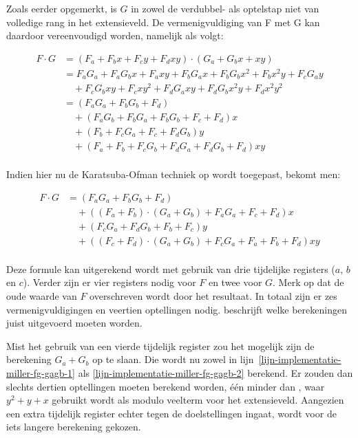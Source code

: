 Zoals eerder opgemerkt, is $G$ in zowel de verdubbel- als optelstap niet van volledige rang in het extensieveld. De vermenigvuldiging van F met G kan daardoor vereenvoudigd worden, namelijk als volgt:

\[\begin{aligned}
F \cdot G	&= (F_a + F_b x + F_c y + F_d xy) \cdot (G_a + G_b x + xy)\\
	&= F_a G_a + F_a G_b x + F_a xy + F_b G_a x + F_b G_b x^2 + F_b x^2y + F_c G_a y\\
		&\quad + F_c G_b xy + F_c xy^2 + F_d G_a xy + F_d G_b x^2y + F_d x^2 y^2\\
	&= (F_a G_a + F_b G_b + F_d)\\
		&\quad + (F_a G_b + F_b G_a + F_b G_b + F_c + F_d)x\\
		&\quad + (F_b + F_c G_a + F_c + F_d G_b)y\\
		&\quad + (F_a + F_b + F_c G_b + F_d G_a + F_d G_b + F_d)xy\\
\end{aligned}\]

Indien hier nu de Karatsuba-Ofman techniek \cite{karatsuba-oldest, zuras} op wordt toegepast, bekomt men:

\[\begin{aligned}
F \cdot G &= (F_a G_a + F_b G_b + F_d)\\
				&\quad + ((F_a + F_b) \cdot (G_a + G_b) + F_a G_a + F_c + F_d)x\\
				&\quad + (F_c G_a + F_d G_b + F_b + F_c)y\\
				&\quad + ((F_c + F_d) \cdot (G_a + G_b) + F_c G_a + F_a + F_b + F_d)xy\\
\end{aligned}\]

Deze formule kan uitgerekend wordt met gebruik van drie tijdelijke registers ($a$, $b$ en $c$). Verder zijn er vier registers nodig voor $F$ en twee voor $G$. Merk op dat de oude waarde van $F$ overschreven wordt door het resultaat. In totaal zijn er zes vermenigvuldigingen en veertien optellingen nodig.  beschrijft welke berekeningen juist uitgevoerd moeten worden.

Mist het gebruik van een vierde tijdelijk register zou het mogelijk zijn de berekening $G_a + G_b$ op te slaan. Die wordt nu zowel in lijn~\ref{lijn-implementatie-miller-fg-gagb-1} als \ref{lijn-implementatie-miller-fg-gagb-2} berekend. Er zouden dan slechts dertien optellingen moeten berekend worden, \'e\'en minder dan \cite{beuchat}, waar $y^2 + y +x$ gebruikt wordt als modulo veelterm voor het extensieveld. Aangezien een extra tijdelijk register echter tegen de doelstellingen ingaat, wordt voor de iets langere berekening gekozen.

